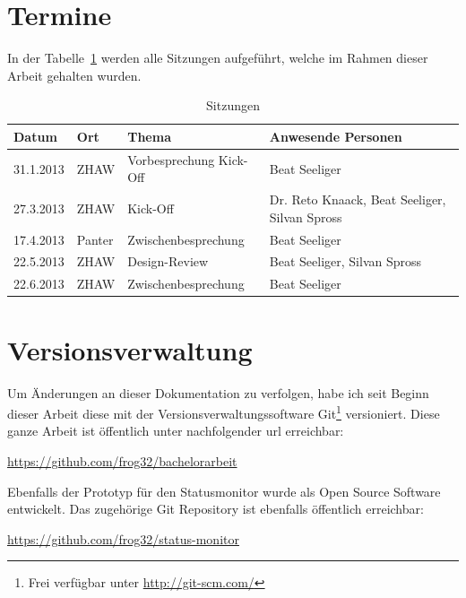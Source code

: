 \section{Termine}
\label{sec:termine}
In der Tabelle~\ref{tab:sitzungen} werden alle Sitzungen aufgeführt, welche im Rahmen dieser Arbeit gehalten wurden.

\begin{table}[h]
  \centering
  \begin{tabular}{lll p{7cm}}
  \toprule
    \textbf{Datum} & \textbf{Ort} & \textbf{Thema} & \textbf{Anwesende Personen}\\
  \hline
    31.1.2013 & ZHAW & Vorbesprechung Kick-Off & Beat Seeliger\\
  \hline
    27.3.2013 & ZHAW & Kick-Off & Dr. Reto Knaack, Beat Seeliger, Silvan Spross\\
  \hline
    17.4.2013 & Panter & Zwischenbesprechung & Beat Seeliger\\
  \hline
    22.5.2013 & ZHAW & Design-Review & Beat Seeliger, Silvan Spross\\
  \hline
    22.6.2013 & ZHAW & Zwischenbesprechung & Beat Seeliger\\
  \bottomrule
  \end{tabular}
  \caption{Sitzungen}
  \label{tab:sitzungen}
\end{table}

\section{Versionsverwaltung}
\label{sec:versionsverwaltung}
Um Änderungen an dieser Dokumentation zu verfolgen, habe ich seit Beginn dieser Arbeit diese mit der Versionsverwaltungssoftware Git\footnote{Frei verfügbar unter \url{http://git-scm.com/}} versioniert. Diese ganze Arbeit ist öffentlich unter nachfolgender \acrshort{url} erreichbar:

\url{https://github.com/frog32/bachelorarbeit}

Ebenfalls der Prototyp für den Statusmonitor wurde als Open Source Software entwickelt. Das zugehörige Git Repository ist ebenfalls öffentlich erreichbar:

\url{https://github.com/frog32/status-monitor}

